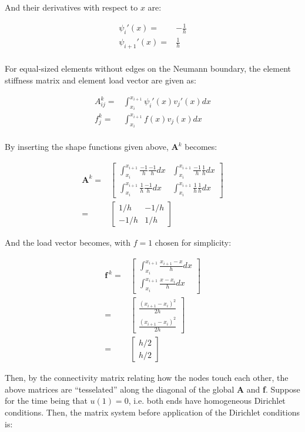 \documentclass[10pt]{article}
\newcommand{\beqa}{\begin{equation}\begin{aligned}}
\newcommand{\eeqa}{\end{aligned}\end{equation}}
\begin{document}
And their derivatives with respect to \(x\) are:

\beqa
\psi_i'(x)=&-\frac{1}{h}\\
\psi_{i+1}'(x) =&\frac{1}{h}\\
\eeqa

For equal-sized elements without edges on the Neumann boundary, the element stiffness matrix and element load vector are given as:

\beqa
A_{ij}^k=&\int_{x_i}^{x_{i+1}}\psi_i'(x)v_j'(x)dx\\
f_j^k=&\int_{x_i}^{x_{i+1}}f(x)v_j(x)dx\\
\eeqa

By inserting the shape functions given above, \(\textbf{A}^k\) becomes:

\beqa
\textbf{A}^k=& \begin{bmatrix}	\int_{x_i}^{x_{i+1}}\frac{-1}{h}\frac{-1}{h}dx & 
										\int_{x_i}^{x_{i+1}}\frac{-1}{h}\frac{1}{h}dx\\
										\int_{x_i}^{x_{i+1}}\frac{1}{h}\frac{-1}{h}dx &
										\int_{x_i}^{x_{i+1}}\frac{1}{h}\frac{1}{h}dx
					\end{bmatrix}\\
			   =& \begin{bmatrix}	1/h & 
										-1/h\\
										-1/h &
										1/h
					\end{bmatrix}
\eeqa

And the load vector becomes, with \(f=1\) chosen for simplicity:

\beqa
\textbf{f}^{\ k}=& \begin{bmatrix}	\int_{x_i}^{x_{i+1}}\frac{x_{i+1}-x}{h}dx \\
										\int_{x_i}^{x_{i+1}}\frac{x-x_i}{h}dx
					\end{bmatrix}\\
			   =& \begin{bmatrix}	\frac{(x_{i+1}-x_i)^2}{2h}\\
										\frac{(x_{i+1}-x_i)^2}{2h}
					\end{bmatrix}\\
				=& \begin{bmatrix}	h/2\\ 
										h/2
					\end{bmatrix}
\eeqa

Then, by the connectivity matrix relating how the nodes touch each other, the above matrices are ``tesselated'' along the diagonal of the global \textbf{A} and \textbf{f}. Suppose for the time being that \(u(1)=0\), i.e. both ends have homogeneous Dirichlet conditions. Then, the matrix system before application of the Dirichlet conditions is:
\end{document}
